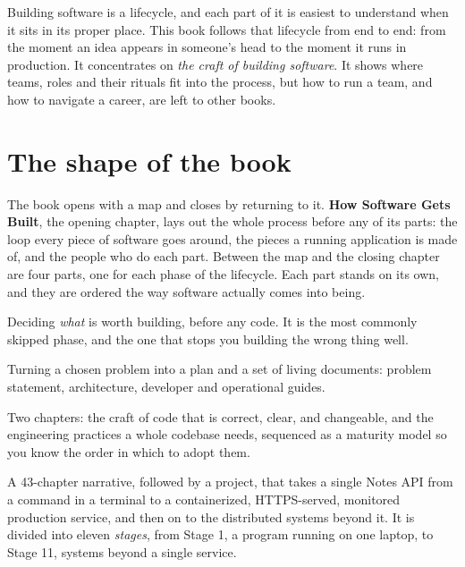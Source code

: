 \chapterrule

Building software is a lifecycle, and each part of it is easiest to understand when it sits in its
proper place. This book follows that lifecycle from end to end: from the moment an idea appears in
someone's head to the moment it runs in production. It concentrates on \emph{the craft of building
software}. It shows where teams, roles and their rituals fit into the process, but how to run a
team, and how to navigate a career, are left to other books.

\section*{The shape of the book}

The book opens with a map and closes by returning to it. \textbf{How Software Gets Built}, the
opening chapter, lays out the whole process before any of its parts: the loop every piece of
software goes around, the pieces a running application is made of, and the people who do each part.
Between the map and the closing chapter are four parts, one for each phase of the lifecycle. Each
part stands on its own, and they are ordered the way software actually comes into being.

\begin{description}[leftmargin=0pt, itemsep=4pt, font=\sffamily\bfseries\color{brand}]
  \item[Part I \textperiodcentered{} Product Discovery.] Deciding \emph{what} is worth building,
    before any code. It is the most commonly skipped phase, and the one that stops you building the wrong
    thing well.
  \item[Part II \textperiodcentered{} Project Planning.] Turning a chosen problem into a plan and a
    set of living documents: problem statement, architecture, developer and operational guides.
  \item[Part III \textperiodcentered{} Writing Good Code.] Two chapters: the craft of code that is
    correct, clear, and changeable, and the engineering practices a whole codebase needs, sequenced
    as a maturity model so you know the order in which to adopt them.
  \item[Part IV \textperiodcentered{} Building Real Applications.] A 43-chapter narrative, followed by a project, that takes
    a single Notes API from a command in a terminal to a containerized, HTTPS-served, monitored
    production service, and then on to the distributed systems beyond it. It is divided into eleven
    \emph{stages}, from Stage 1, a program running on one laptop, to Stage 11, systems beyond a single service.
\end{description}

